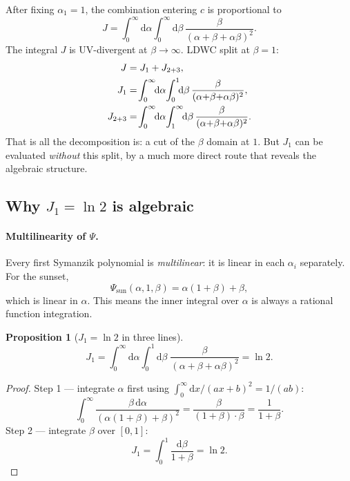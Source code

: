 \documentclass[10pt,a4paper,twocolumn]{article}
\theoremstyle{plain}
\newtheorem{proposition}[theorem]{Proposition}
\theoremstyle{definition}
\newcommand{\dd}{\mathrm{d}}
\renewcommand{\Psi}{\varPsi}
\begin{document}
After fixing $\alpha_1 = 1$, the combination entering $c$ is
proportional to
\begin{equation}\label{eq:J-full}
  J = \!\int_0^\infty\!\!\dd\alpha\!\int_0^\infty\!\!\dd\beta\,
    \frac{\beta}{(\alpha+\beta+\alpha\beta)^2}.
\end{equation}
The integral $J$ is UV-divergent at $\beta\to\infty$.
LDWC split at $\beta = 1$:
\begin{align}\label{eq:J-split}
  J &= J_1 + J_{2+3},\\
  J_1 &= \!\int_0^\infty\!\!\dd\alpha\!\int_0^1\!\!\dd\beta\,
    \frac{\beta}{(\alpha{+}\beta{+}\alpha\beta)^2},\notag\\
  J_{2+3} &= \!\int_0^\infty\!\!\dd\alpha\!\int_1^\infty\!\!\dd\beta\,
    \frac{\beta}{(\alpha{+}\beta{+}\alpha\beta)^2}.\notag
\end{align}
That is all the decomposition is: a cut of the $\beta$ domain at $1$.
But $J_1$ can be evaluated \emph{without} this split, by a much
more direct route that reveals the algebraic structure.

\subsection{Why $J_1 = \ln 2$ is algebraic}

\paragraph{Multilinearity of $\Psi$.}
Every first Symanzik polynomial is \emph{multilinear}: it is
linear in each $\alpha_i$ separately.  For the sunset,
\[
  \Psi_{\text{sun}}(\alpha,1,\beta)
  = \alpha(1+\beta) + \beta,
\]
which is linear in $\alpha$.  This means the inner integral over
$\alpha$ is always a rational function integration.

\begin{proposition}[$J_1 = \ln 2$ in three lines]
\label{prop:J1}
\[
  J_1
  = \int_0^\infty\!\dd\alpha\int_0^1\!\dd\beta\;
    \frac{\beta}{(\alpha+\beta+\alpha\beta)^2}
  = \ln 2.
\]
\end{proposition}
\begin{proof}
Step 1 --- integrate $\alpha$ first using
$\int_0^\infty \dd x/(ax+b)^2 = 1/(ab)$:
\begin{equation}\label{eq:inner-alpha}
  \int_0^\infty\!
    \frac{\beta\,\dd\alpha}{(\alpha(1+\beta)+\beta)^2}
  = \frac{\beta}{(1+\beta)\cdot\beta}
  = \frac{1}{1+\beta}.
\end{equation}
Step 2 --- integrate $\beta$ over $[0,1]$:
\begin{equation}\label{eq:outer-beta}
  J_1 = \int_0^1\!\frac{\dd\beta}{1+\beta} = \ln 2.
\end{equation}
\end{proof}
\end{document}
